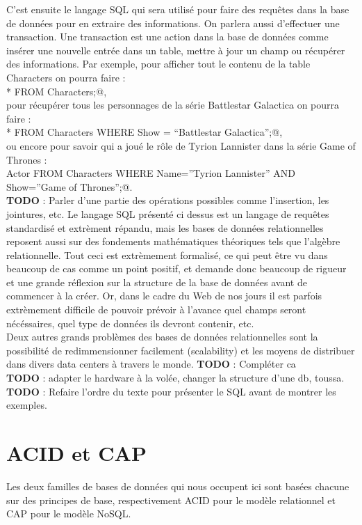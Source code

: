 \documentclass[11pt]{article}
\begin{document}
C'est ensuite le langage SQL qui sera utilisé pour faire des requêtes dans la base de données pour en extraire des informations. On parlera aussi d'effectuer une transaction. Une transaction est une action dans la base de données comme insérer une nouvelle entrée dans un table, mettre à jour un champ ou récupérer des informations. Par exemple, pour afficher tout le contenu de la table Characters on pourra faire : \\
\verb@SELECT * FROM Characters;@, \\
pour récupérer tous les personnages de la série Battlestar Galactica on pourra faire : \\
\verb@SELECT * FROM Characters WHERE Show = ``Battlestar Galactica'';@, \\
ou encore pour savoir qui a joué le rôle de Tyrion Lannister dans la série Game of Thrones : \\
\verb@SELECT Actor FROM Characters WHERE Name=''Tyrion Lannister'' AND Show=''Game of Thrones'';@. \\ 
\textbf{TODO} : Parler d'une partie des opérations possibles comme l'insertion, les jointures, etc.
Le langage SQL présenté ci dessus est un langage de requêtes standardisé et extrèment répandu, mais les bases de données relationnelles reposent aussi sur des fondements mathématiques théoriques tels que l'algèbre relationnelle. Tout ceci est extrèmement formalisé, ce qui peut être vu dans beaucoup de cas comme un point positif, et demande donc beaucoup de rigueur et une grande réflexion sur la structure de la base de données avant de commencer à la créer. Or, dans le cadre du Web de nos jours il est parfois extrèmement difficile de pouvoir prévoir à l'avance quel champs seront nécéssaires, quel type de données ils devront contenir, etc. \\
Deux autres grands problèmes des bases de données relationnelles sont la possibilité de redimmensionner facilement (scalability) et les moyens de distribuer dans divers data centers à travers le monde. \textbf{TODO} : Compléter ca \\
\textbf{TODO} : adapter le hardware à la volée, changer la structure d'une db, toussa. \\
\textbf{TODO} : Refaire l'ordre du texte pour présenter le SQL avant de montrer les exemples.

\section{ACID et CAP}
Les deux familles de bases de données qui nous occupent ici sont basées chacune sur des principes de base, respectivement ACID pour le modèle relationnel et CAP pour le modèle NoSQL. \\
\end{document}
